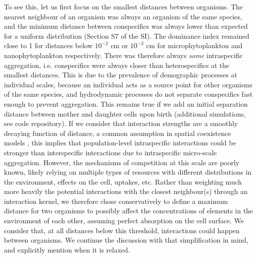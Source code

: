 \documentclass[12pt,english]{article}
\begin{document}
To see this, let us first focus on the smallest distances between
organisms. The nearest neighbour of an organism was always an organism
of the same species, and the minimum distance between conspecifics
was always lower than expected for a uniform distribution (Section
S7 of the SI). The dominance index remained close to 1 for distances
below $10^{-2}$ cm or $10^{-3}$ cm for microphytoplankton and nanophytoplankton
respectively. There was therefore always \emph{some} intraspecific
aggregation, i.e. conspecifics were always closer than heterospecifics
at the smallest distances. This is due to the prevalence of demographic
processes at individual scales, because an individual acts as a source
point for other organisms of the same species, and hydrodynamic processes
do not separate conspecifics fast enough to prevent aggregation. This remains true if we add an initial separation distance between mother and daughter cells upon birth (additional simulations, see code repository). If we consider that interaction strengths are a smoothly decaying function
of distance, a common assumption in spatial coexistence models \citep[e.g., ][]{bolker_spatial_1999,law_population_2003},
this implies that population-level intraspecific interactions could
be stronger than interspecific interactions due to intraspecific micro-scale
aggregation. However, the mechanisms of competition at this scale
are poorly known, likely relying on multiple types of resources with
different distributions in the environment, effects on the cell, uptakes,
etc. Rather than weighting much more heavily the potential interactions
with the closest neighbour(s) through an interaction kernel, we therefore
chose conservatively to define a maximum distance for two organisms
to possibly affect the concentrations of elements in the environment
of each other, assuming perfect absorption on the cell surface. We consider that, at all distances below this threshold, interactions could happen between organisms. We continue the discussion with that simplification in mind, and explicitly mention when it is relaxed.
\end{document}
